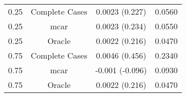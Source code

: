 \begin{table}[ht]
\centering
\begin{tabular}{cccc}
  \hline
  \hline
0.25 & Complete Cases & 0.0023 (0.227) & 0.0560 \\ 
  0.25 & mcar & 0.0023 (0.234) & 0.0550 \\ 
  0.25 & Oracle & 0.0022 (0.216) & 0.0470 \\ 
  0.75 & Complete Cases & 0.0046 (0.456) & 0.2340 \\ 
  0.75 & mcar & -0.001 (-0.096) & 0.0930 \\ 
  0.75 & Oracle & 0.0022 (0.216) & 0.0470 \\ 
   \hline
\end{tabular}
\end{table}
